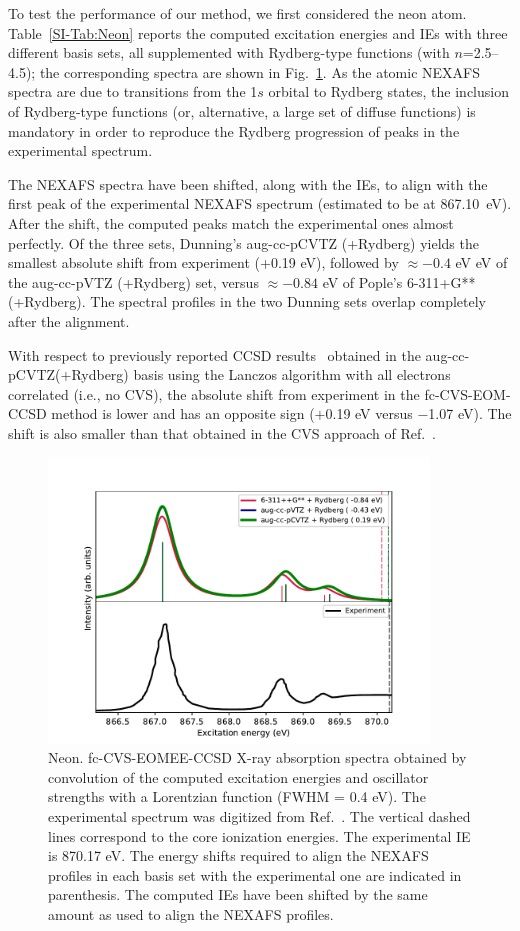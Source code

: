\documentclass[journal=jctcce,manuscript=article]{achemso}
\begin{document}
To test the performance of our method, we first considered the neon atom.  Table~\ref{SI-Tab:Neon} reports the computed excitation energies and IEs with three different basis sets, all supplemented with Rydberg-type functions (with $n$=2.5--4.5); the corresponding spectra are shown in Fig.~\ref{fgr:neon}. 
As the atomic NEXAFS spectra are due to transitions from the 1$s$ orbital to Rydberg states, the inclusion of Rydberg-type functions (or, alternative, a large set of diffuse functions) is mandatory in order to reproduce the Rydberg progression of peaks in the experimental spectrum.~\cite{coriani2012pra}

The NEXAFS spectra have been shifted, along with the IEs, to align with the first peak of the experimental NEXAFS spectrum (estimated to be at 867.10~eV). After the shift, the computed peaks match the  experimental ones almost perfectly. Of the three sets, Dunning's aug-cc-pCVTZ (+Rydberg) yields the smallest absolute shift from experiment (+0.19 eV), followed by $\approx -0.4$ eV eV of the aug-cc-pVTZ (+Rydberg) set, versus $\approx -0.84$ eV of Pople's  6-311+G**(+Rydberg). The spectral profiles in the two Dunning sets overlap completely after the alignment. 

With respect to previously reported CCSD results~\cite{coriani2012pra} obtained in the aug-cc-pCVTZ(+Rydberg) basis using the Lanczos algorithm with all electrons correlated (i.e., no CVS), the absolute shift from experiment in the fc-CVS-EOM-CCSD method is lower and has an opposite sign ($+$0.19 eV versus $-$1.07 eV). The shift is also smaller than that obtained 
in the CVS approach of Ref.~. 

\begin{figure}[H]
\includegraphics[width=0.9\textwidth]{Spectra/Ne_aCT.pdf}  
\caption{Neon. fc-CVS-EOMEE-CCSD X-ray absorption spectra obtained by convolution of the computed excitation energies and oscillator strengths with a Lorentzian function (FWHM = 0.4 eV). The experimental spectrum was digitized from Ref.~. 
The vertical dashed lines correspond to the core ionization energies. The experimental IE is 870.17 eV. 
The energy shifts 
required to align the NEXAFS profiles in each basis set with the
experimental one are indicated in parenthesis. The computed IEs have been shifted by the same amount as used to align the NEXAFS profiles.
\label{fgr:neon}
}
\end{figure}
\end{document}
